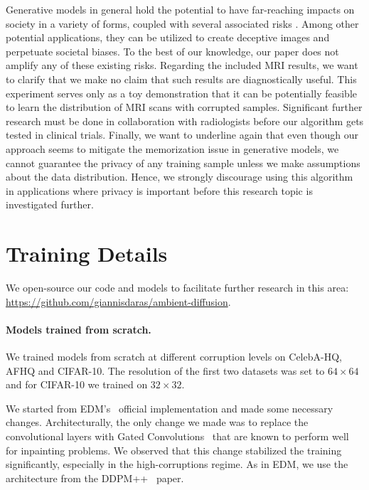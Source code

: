 \documentclass{article}
\begin{document}
Generative models in general hold the potential to have far-reaching impacts on society in a variety of forms, coupled with several associated risks \cite{menon2020pulse,karras2019style,karras2020analyzing,karras2021alias}. Among other potential applications, they can be utilized to create deceptive images and perpetuate societal biases. To the best of our knowledge, our paper does not amplify any of these existing risks. Regarding the included MRI results, we want to clarify that we make no claim that such results are diagnostically useful. This experiment serves only as a toy demonstration that it can be potentially feasible to learn the distribution of MRI scans with corrupted samples. Significant further research must be done in collaboration with radiologists before our algorithm gets tested in clinical trials. Finally, we want to underline again that even though our approach seems to mitigate the memorization issue in generative models, we cannot guarantee the privacy of any training sample unless we make assumptions about the data distribution. Hence, we strongly discourage using this algorithm in applications where privacy is important before this research topic is investigated further.



\section{Training Details}
\label{sec:training_details}
We open-source our code and models to facilitate further research in this area: \href{https://github.com/giannisdaras/ambient-diffusion}{https://github.com/giannisdaras/ambient-diffusion}.

\paragraph{Models trained from scratch.}

We trained models from scratch at different corruption levels on CelebA-HQ, AFHQ and CIFAR-10. The resolution of the first two datasets was set to $64\times64$ and for CIFAR-10 we trained on $32\times 32$. 

We started from EDM's~\citep{karras2022elucidating} official implementation and made some necessary changes. 
Architecturally, the only change we made was to replace the convolutional layers with Gated Convolutions~\citep{gated_conv} that are known to perform well for inpainting problems. We observed that this change stabilized the training significantly, especially in the high-corruptions regime. As in EDM, we use the architecture from the DDPM++~\citep{ddpm++} paper.
\end{document}
